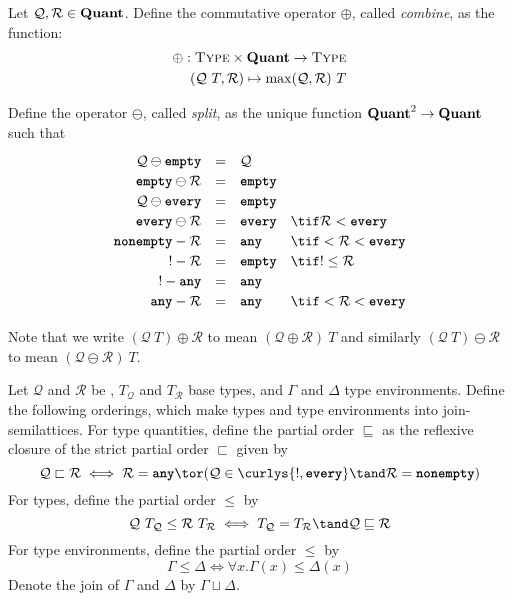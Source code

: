 \documentclass[10pt]{article}
\begin{document}
\begin{definition}
    Let $\mathcal{Q}, \mathcal{R} \in \textbf{Quant}$.
    Define the commutative operator $\oplus$, called \emph{combine}, as the function:
    \begin{align*}
        \oplus : \textsc{Type} \times \textbf{Quant} \to \textsc{Type} \\
        (\mathcal{Q}~T, \mathcal{R}) \mapsto \max(\mathcal{Q}, \mathcal{R})~T
    \end{align*}

    Define the operator $\ominus$, called \emph{split}, as the unique function $\textbf{Quant}^2 \to \textbf{Quant}$ such that
    \[
        \renewcommand\arraystretch{1.2}
        \begin{array}{r c l l l}
            \mathcal{Q} \ominus \emptyq & = & \mathcal{Q} & \\
            \emptyq \ominus \mathcal{R} & = & \emptyq & \\
            \mathcal{Q} \ominus \every &= & \emptyq & \\
            \every \ominus \mathcal{R} &= & \every & \tif \mathcal{R} < \every \\
            \nonempty - \mathcal{R} &= & \any & \tif \empty < \mathcal{R} < \every \\
            \exactlyone - \mathcal{R} &= & \emptyq & \tif \exactlyone \leq \mathcal{R} \\
            \exactlyone - \any &= & \any & \\
            \any - \mathcal{R} &= & \any & \tif \empty < \mathcal{R} < \every \\
        \end{array}
    \]
\end{definition}
Note that we write $(\mathcal{Q}~T) \oplus \mathcal{R}$ to mean $(\mathcal{Q} \oplus \mathcal{R})~T$ and similarly $(\mathcal{Q}~T) \ominus \mathcal{R}$ to mean $(\mathcal{Q} \ominus \mathcal{R})~T$.

\begin{definition}
    Let $\mathcal{Q}$ and $\mathcal{R}$ be \typeQuantities, $T_\mathcal{Q}$ and $T_\mathcal{R}$ base types, and $\Gamma$ and $\Delta$ type environments.
    Define the following orderings, which make types and type environments into join-semilattices.
    For type quantities, define the partial order $\sqsubseteq$ as the reflexive closure of the strict partial order $\sqsubset$ given by
    \[
        \mathcal{Q} \sqsubset \mathcal{R} \iff \mathcal{R} = \any \tor (\mathcal{Q} \in \curlys{\exactlyone, \every} \tand \mathcal{R} = \nonempty)
    \]
    For types, define the partial order $\leq$ by
    \[
        \mathcal{Q}~T_\mathcal{Q} \leq \mathcal{R}~T_\mathcal{R} \iff T_\mathcal{Q} = T_\mathcal{R} \tand \mathcal{Q} \sqsubseteq \mathcal{R}
    \]
    For type environments, define the partial order $\leq$ by
    \[
        \Gamma \leq \Delta \iff \forall x. \Gamma(x) \leq \Delta(x)
    \]
    Denote the join of $\Gamma$ and $\Delta$ by $\Gamma \sqcup \Delta$.
\end{definition}
\end{document}
